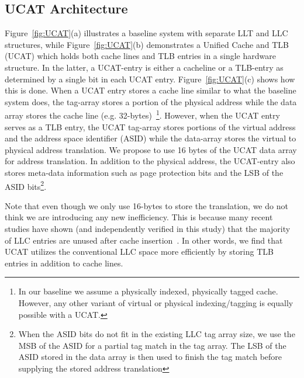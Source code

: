 
\subsection{UCAT Architecture}

\noindent Figure~\ref{fig:UCAT}(a) illustrates a baseline system with
separate LLT and LLC structures, while Figure~\ref{fig:UCAT}(b)
demonstrates a Unified Cache and TLB (UCAT) which holds both cache
lines and TLB entries in a single hardware structure. In the latter, a
UCAT-entry is either a cacheline or a TLB-entry as determined by a
single bit in each UCAT entry. Figure~\ref{fig:UCAT}(c) shows how this
is done. When a UCAT entry stores a cache line similar to what the
baseline system does, the tag-array stores a portion of the physical
address while the data array stores the cache line (e.g.
32-bytes)~\footnote{In our baseline we assume a physically indexed,
physically tagged cache. However, any other variant of virtual or
physical indexing/tagging is equally possible with a UCAT.}. However,
when the UCAT entry serves as a TLB entry, the UCAT tag-array stores
portions of the virtual address and the address space identifier
(ASID) while the data-array stores the virtual to physical address
translation. We propose to use 16 bytes of the UCAT data array for
address translation. In addition to the physical address, the
UCAT-entry also stores meta-data information such as page protection
bits and the LSB of the ASID bits\footnote{When the ASID bits do not
fit in the existing LLC tag array size, we use the MSB of the ASID for
a partial tag match in the tag array. The LSB of the ASID stored in
the data array is then used to finish the tag match before supplying
the stored address translation}.

Note that even though we only use 16-bytes to store the translation,
we do not think we are introducing any new inefficiency. This is
because many recent studies have shown (and independently verified in
this study) that the majority of LLC entries are unused after cache
insertion~\cite{}. In other words, we find that UCAT utilizes the
conventional LLC space more efficiently by storing TLB entries in
addition to cache lines.

